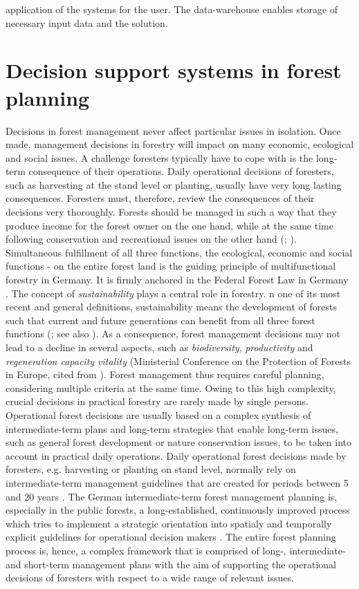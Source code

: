 application of the systems for the user. The data-warehouse enables storage of necessary input data and the solution.

\section{Decision support systems in forest planning}
\label{sec:intro:dss}
Decisions in forest management never affect particular issues in isolation. Once made, management decisions in forestry will impact on many economic, ecological and social issues. A challenge foresters typically have to cope with is the long-term consequence of their operations. Daily operational decisions of foresters, such as harvesting at the stand level or planting, usually have very long lasting consequences. Foresters must, therefore, review the consequences of their decisions very thoroughly. Forests should be managed in such a way that they produce income for the forest owner on the one hand, while at the same time following conservation and recreational issues on the other hand (\citealp[p. 11]{kangas_2015}; \citealp[p. 67]{mohring_1997}). Simultaneous fulfillment of all three functions, the ecological, economic and social functions - on the entire forest land is the guiding principle of multifunctional forestry in Germany. It is firmly anchored in the Federal Forest Law in Germany \citep[p. 457]{moller_2007}. The concept of \textit{sustainability} plays a central role in forestry. n one of its most recent and general definitions, sustainability means the development of forests such that current and future generations can benefit from all three forest functions (\citealp[p. 14]{un_2005}; see also \citealp[p. 14]{kangas_2015}). As a consequence, forest management decisions may not lead to a decline in several aspects, such as \textit{biodiversity}, \textit{productivity} and \textit{regeneration capacity vitality} (Ministerial Conference on the Protection of Forests in Europe, cited from \citealp[p. 15]{kangas_2015}). Forest management thus requires careful planning, considering multiple criteria at the same time. Owing to this high complexity, crucial decisions in practical forestry are rarely made by single persons. Operational forest decisions are usually based on a complex synthesis of intermediate-term plans and long-term strategies that enable long-term issues, such as general forest development or nature conservation issues, to be taken into account in practical daily operations. Daily operational forest decisions made by foresters, e.g. harvesting or planting on stand level, normally rely on intermediate-term management guidelines that are created for periods between 5 and 20 years \citep[p. 12]{kangas_2015}. The German intermediate-term forest management planning is, especially in the public forests, a long-established, continuously improved process which tries to implement a strategic orientation into spatialy and temporally explicit guidelines for operational decision makers \citep[p. 156-158]{bockmann_2004}. The entire forest planning process is, hence, a complex framework that is comprised of long-, intermediate- and short-term management plans with the aim of supporting the operational decisions of foresters with respect to a wide range of relevant issues.

